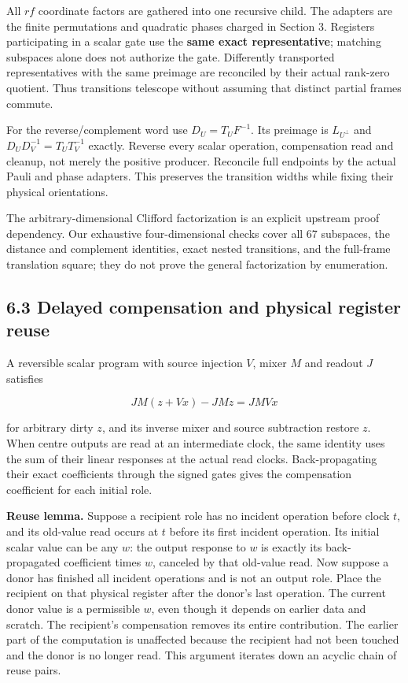 \documentclass[
  11pt,
]{article}
\begin{document}
All \(rf\) coordinate factors are gathered into one recursive child. The
adapters are the finite permutations and quadratic phases charged in
Section 3. Registers participating in a scalar gate use the \textbf{same
exact representative}; matching subspaces alone does not authorize the
gate. Differently transported representatives with the same preimage are
reconciled by their actual rank-zero quotient. Thus transitions
telescope without assuming that distinct partial frames commute.

For the reverse/complement word use \(D_U=T_UF^{-1}\). Its preimage is
\(L_{U^\perp}\) and \(D_UD_V^{-1}=T_UT_V^{-1}\) exactly. Reverse every
scalar operation, compensation read and cleanup, not merely the positive
producer. Reconcile full endpoints by the actual Pauli and phase
adapters. This preserves the transition widths while fixing their
physical orientations.

The arbitrary-dimensional Clifford factorization is an explicit upstream
proof dependency. Our exhaustive four-dimensional checks cover all 67
subspaces, the distance and complement identities, exact nested
transitions, and the full-frame translation square; they do not prove
the general factorization by enumeration.

\subsection{6.3 Delayed compensation and physical register
reuse}\label{delayed-compensation-and-physical-register-reuse}

A reversible scalar program with source injection \(V\), mixer \(M\) and
readout \(J\) satisfies

\[
JM(z+Vx)-JMz=JMVx
\]

for arbitrary dirty \(z\), and its inverse mixer and source subtraction
restore \(z\). When centre outputs are read at an intermediate clock,
the same identity uses the sum of their linear responses at the actual
read clocks. Back-propagating their exact coefficients through the
signed gates gives the compensation coefficient for each initial role.

\textbf{Reuse lemma.} Suppose a recipient role has no incident operation
before clock \(t\), and its old-value read occurs at \(t\) before its
first incident operation. Its initial scalar value can be any \(w\): the
output response to \(w\) is exactly its back-propagated coefficient
times \(w\), canceled by that old-value read. Now suppose a donor has
finished all incident operations and is not an output role. Place the
recipient on that physical register after the donor's last operation.
The current donor value is a permissible \(w\), even though it depends
on earlier data and scratch. The recipient's compensation removes its
entire contribution. The earlier part of the computation is unaffected
because the recipient had not been touched and the donor is no longer
read. This argument iterates down an acyclic chain of reuse pairs.
\end{document}
